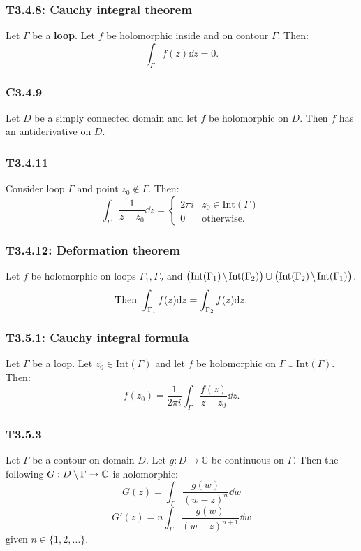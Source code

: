 \documentclass{article}
\begin{document}
\begin{multicols*}{3}
\subsubsection*{T3.4.8: Cauchy integral theorem}
Let $\Gamma$ be a \textbf{loop}. Let $f$ be holomorphic
inside and on contour $\Gamma$. Then:
$$\int_{\Gamma}f(z)\dd z=0.$$

\subsubsection*{C3.4.9}
Let $D$ be a simply connected domain and let $f$ be holomorphic on
$D$. Then $f$ has an antiderivative on $D$.

\subsubsection*{T3.4.11}
Consider loop $\Gamma$ and point $z_0\notin\Gamma$. Then:
$$\int_{\Gamma}\frac{1}{z-z_0}\dd z=\left\{\begin{array}{ll}
2\pi i & z_0\in\text{Int}(\Gamma) \\ 0 & \text{otherwise.}
\end{array}\right.$$

\subsubsection*{T3.4.12: Deformation theorem}
Let $f$ be holomorphic on loops $\Gamma_1,\Gamma_2$ and
$\bigl(\text{Int}(\Gamma_1)\hspace{0.02in}\backslash\hspace{0.02in}
\text{Int}(\Gamma_2)\bigr)\cup\bigl(\text{Int}(\Gamma_2)\hspace{0.02in}
\backslash\hspace{0.02in}\text{Int}(\Gamma_1)\bigr)$.
$$\text{Then}\hspace{0.05in}\int_{\Gamma_1}f(z)\dd z
=\int_{\Gamma_2}f(z)\dd z.$$

\subsubsection*{T3.5.1: Cauchy integral formula}
Let $\Gamma$ be a loop. Let $z_0\in\text{Int}(\Gamma)$ and let
$f$ be holomorphic on $\Gamma\cup\text{Int}(\Gamma)$. Then:
$$f(z_0)=\frac{1}{2\pi i}\int_{\Gamma}\frac{f(z)}{z-z_0}\dd z.$$

\subsubsection*{T3.5.3}
Let $\Gamma$ be a contour on domain $D$. Let
$g:D\rightarrow\mathbb{C}$ be continuous on $\Gamma$.
Then the following $G:D\hspace{0.03in}\backslash
\hspace{0.03in}\Gamma\rightarrow\mathbb{C}$ is holomorphic:
$$G(z)=\int_{\Gamma}\frac{g(w)}{(w-z)^n}\dd w$$
$$G'(z)=n\int_{\Gamma}\frac{g(w)}{(w-z)^{n+1}}\dd w$$
given $n\in\{1,2,\dots\}$.


\end{multicols*}
\end{document}
